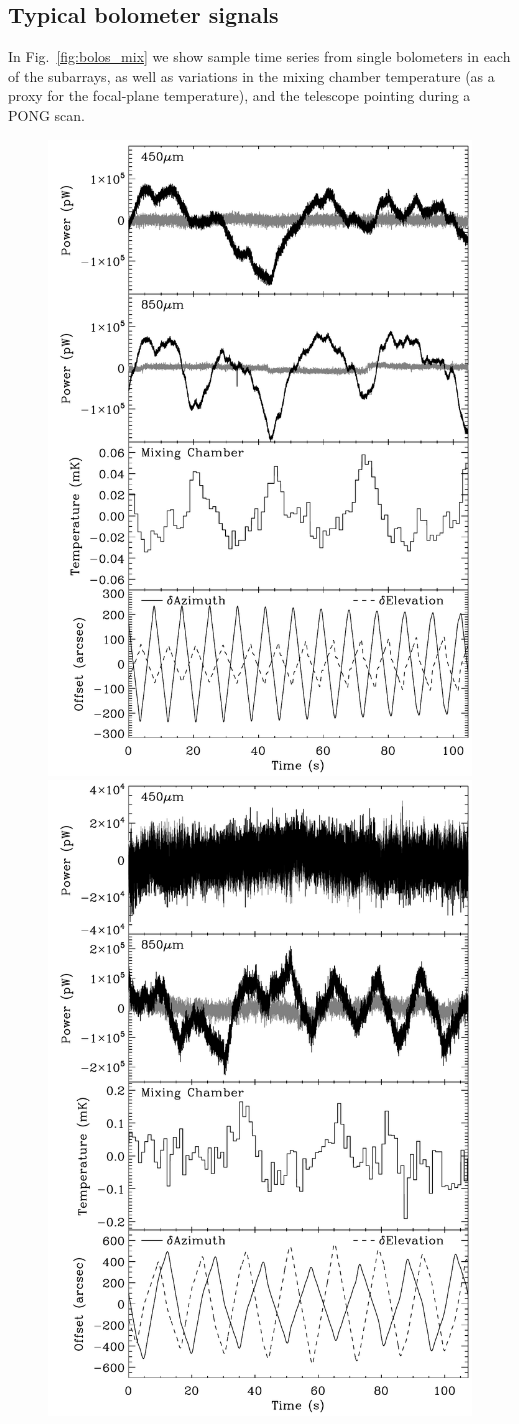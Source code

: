 \documentclass[useAMS,usenatbib,nofootinbib]{mn2e}
\begin{document}
\subsection{Typical bolometer signals}
\label{sec:bolosignal}

In Fig.~\ref{fig:bolos_mix} we show sample time series from single
bolometers in each of the subarrays, as well as variations in the
mixing chamber temperature (as a proxy for the focal-plane
temperature), and the telescope pointing during a PONG scan.

\begin{figure}
\centering
\includegraphics[width=0.49\linewidth]{bolos_point_mix_s2sro.pdf}
\includegraphics[width=0.49\linewidth]{bolos_point_mix.pdf}

\end{figure}
\end{document}
